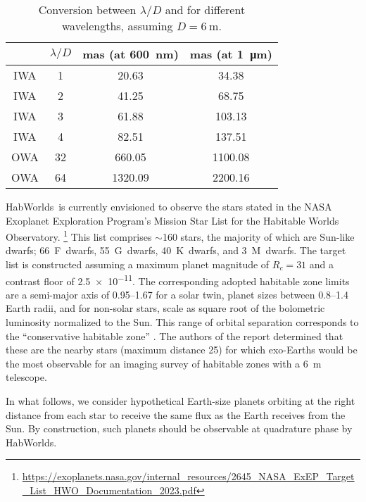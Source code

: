 \documentclass[
    usenatbib,
]{mnras}
\newcommand{\todo}[1]{\textcolor{red}{[#1]}}
\newcommand{\hwo}{HabWorlds}
\begin{document}
\begin{table}
    \centering
    \caption{
        Conversion between $\lambda / D$ and \si{\mas} for different wavelengths, assuming $D = \SI{6}{\meter}$. 
    }
    \label{tab:IWA_OWA}
    \begin{tabular}{ c c c c } 
    \toprule
     & $\lambda/D$ & mas (at \SI{600}{\nano\meter}) & mas (at \SI{1}{\micro\meter}) \\
    \midrule
    \midrule
    IWA & 1 & 20.63 & 34.38 \\
    IWA & 2 & 41.25 & 68.75 \\
    IWA & 3 & 61.88 & 103.13 \\
    IWA & 4 & 82.51 & 137.51 \\
    \midrule
    OWA & 32 &  660.05 & 1100.08 \\
    OWA & 64 & 1320.09 & 2200.16 \\
    \bottomrule
    \end{tabular}
\end{table}


\hwo\ is currently envisioned to observe the stars stated in the NASA Exoplanet Exploration Program's Mission Star List for the Habitable Worlds Observatory.%
\footnote{\url{https://exoplanets.nasa.gov/internal_resources/2645_NASA_ExEP_Target_List_HWO_Documentation_2023.pdf}}
%
This list comprises $\sim$160 stars, the majority of which are Sun-like dwarfs; 66~F~dwarfs, 55~G~dwarfs, 40~K~dwarfs, and 3~M~dwarfs.
%
The target list is constructed assuming a maximum planet magnitude of $R_c = 31$ and a contrast floor of \num{2.5e-11}. 
The corresponding adopted habitable zone limits are a semi-major axis of \SIrange{0.95}{1.67}{\au} for a solar twin, planet sizes between \SIrange{0.8}{1.4}{} Earth radii, and for non-solar stars, scale as square root of the bolometric luminosity normalized to the Sun. 
%
This range of orbital separation corresponds to the \enquote{conservative habitable zone} \citep{kasting93, kopparapu13}. 
The authors of the report determined that these are the nearby stars (maximum distance \SI{25}{\parsec}) for which exo-Earths would be the most observable for an imaging survey of habitable zones with a \SI{6}{\meter} telescope. 

In what follows, we consider hypothetical Earth-size planets orbiting at the right distance from each star to receive the same flux as the Earth receives from the Sun. By construction, such planets should be observable at quadrature phase by HabWorlds. 
\end{document}
